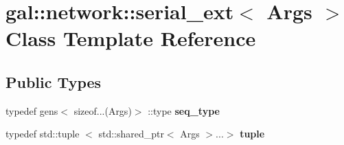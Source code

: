 \hypertarget{classgal_1_1network_1_1serial__ext}{\section{gal\-:\-:network\-:\-:serial\-\_\-ext$<$ \-Args $>$ \-Class \-Template \-Reference}
\label{classgal_1_1network_1_1serial__ext}
}
\subsection*{\-Public \-Types}
\begin{DoxyCompactItemize}
\item 
\hypertarget{classgal_1_1network_1_1serial__ext_a67ab3df55041b1a29a039223d45575f4}{typedef gens$<$ sizeof...(\-Args)$>$\*
\-::type {\bfseries seq\-\_\-type}}\label{classgal_1_1network_1_1serial__ext_a67ab3df55041b1a29a039223d45575f4}

\item 
\hypertarget{classgal_1_1network_1_1serial__ext_a41bae0b2f8a46739862abc99ef1a135e}{typedef std\-::tuple\*
$<$ std\-::shared\-\_\-ptr$<$ \-Args $>$...$>$ {\bfseries tuple}}\label{classgal_1_1network_1_1serial__ext_a41bae0b2f8a46739862abc99ef1a135e}

\end{DoxyCompactItemize}
